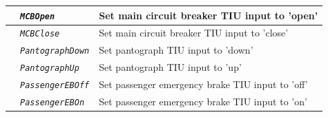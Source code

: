 \documentclass{template/openetcs}
\begin{document}
\begin{itemize}
\begin{longtable}{|l|l|l|}
			\hline
			
			&	\begin{minipage}[t]{0.40\linewidth} \emph{\texttt{MCBOpen}} \end{minipage}
			&	\begin{minipage}[t]{0.38\linewidth} Set main circuit breaker TIU input to ’open’ \end{minipage} \\
			
			\hline
			
			&	\begin{minipage}[t]{0.40\linewidth} \emph{\texttt{MCBClose}} \end{minipage}
			&	\begin{minipage}[t]{0.38\linewidth} Set main circuit breaker TIU input to ’close’ \end{minipage} \\
			
			\hline
			
			&	\begin{minipage}[t]{0.40\linewidth} \emph{\texttt{PantographDown}} \end{minipage}
			&	\begin{minipage}[t]{0.38\linewidth} Set pantograph TIU input to ’down’ \end{minipage} \\
			
			\hline
			
			&	\begin{minipage}[t]{0.40\linewidth} \emph{\texttt{PantographUp}} \end{minipage}
			&	\begin{minipage}[t]{0.38\linewidth} Set pantograph TIU input to ’up’ \end{minipage} \\
			
			\hline
			
			&	\begin{minipage}[t]{0.40\linewidth} \emph{\texttt{PassengerEBOff}} \end{minipage}
			&	\begin{minipage}[t]{0.38\linewidth} Set passenger emergency brake TIU input to ’off’ \end{minipage} \\
			
			\hline
			
			&	\begin{minipage}[t]{0.40\linewidth} \emph{\texttt{PassengerEBOn}} \end{minipage}
			&	\begin{minipage}[t]{0.38\linewidth} Set passenger emergency brake TIU input to ’on’ \end{minipage} \\
			

\end{longtable}
\end{itemize}
\end{document}
